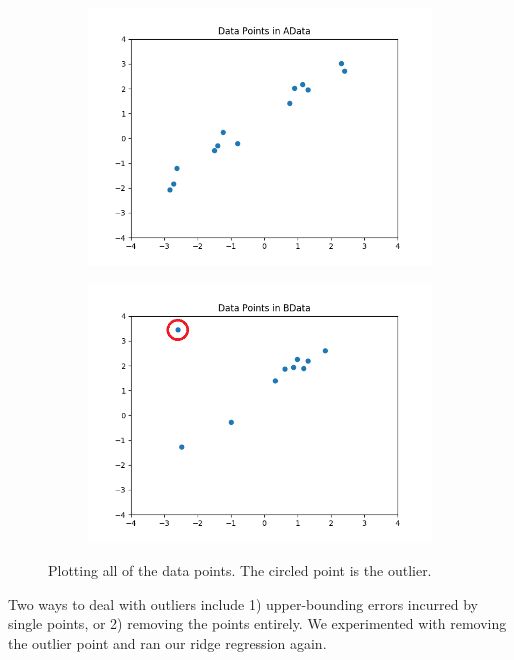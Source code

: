 \documentclass[8pt]{article}
\begin{document}
\begin{figure}[H]
\centering
        \begin{subfigure}[b]{0.4\textwidth}
                \includegraphics[width=\linewidth]{../P3/figs/A_data.png}
        \end{subfigure}%
        \begin{subfigure}[b]{0.4\textwidth}
                \includegraphics[width=\linewidth]{../P3/figs/B_data.png}
        \end{subfigure}%
  \caption*{Plotting all of the data points. The circled point is the outlier.}
\end{figure}

Two ways to deal with outliers include 1) upper-bounding errors incurred by single points, or 2) removing the points entirely. We experimented with removing the outlier point and ran our ridge regression again.
\end{document}
